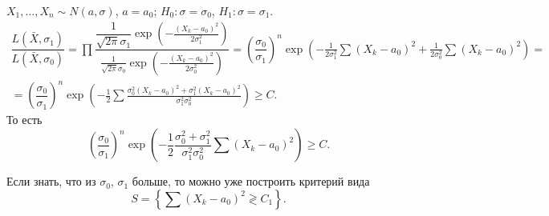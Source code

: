 



  

\begin{ex}
  $X_1,\dots,X_n \sim N(a, \sigma)$, $a = a_0$;
  $H_0 : \sigma = \sigma_0$,
  $H_1 : \sigma = \sigma_1$.
  \begin{multline*}
    \dfrac{L(\bar X, \sigma_1)}{L(\bar X, \sigma_0)}
    = \prod \dfrac{\dfrac{1}{\sqrt{2\pi} \sigma_1} \exp\left(- \frac{(X_k -
    a_0)^2}{2\sigma_1^2}\right)}{\frac{1}{\sqrt{2\pi} \sigma_0} \exp\left(- \frac{(X_k - a_0)^2}{2\sigma_0^2}\right)}
    = \left(\dfrac{\sigma_0}{\sigma_1}\right)^n \exp\left(-\frac{1}{2\sigma_1^2}
    \sum (X_k-a_0)^2 + \frac{1}{2\sigma_0^2} \sum (X_k-a_0)^2 \right) = \\
    = \left(\dfrac{\sigma_0}{\sigma_1}\right)^n \exp\left( -\frac{1}{2} \sum
    \frac{\sigma_0^2 (X_k-a_0)^2 + \sigma_1^2 (X_k - a_0)^2}{\sigma_1^2
  \sigma_0^2} \right) \geqslant C.
  \end{multline*}
То есть
  \begin{equation*}
    \left(\dfrac{\sigma_0}{\sigma_1}\right)^n \exp\left(-\dfrac{1}{2}
    \dfrac{\sigma_0^2 + \sigma_1^2}{\sigma_1^2 \sigma_0^2} \sum
  (X_k-a_0)^2\right) \geqslant C.
  \end{equation*}

  Если знать, что из $ \sigma_0 $, $ \sigma_1 $ больше, то можно уже построить
  критерий вида
  $$ S = \left\{ \sum(X_k-a_0)^2 \gtrless C_1 \right\}. $$
\end{ex}

